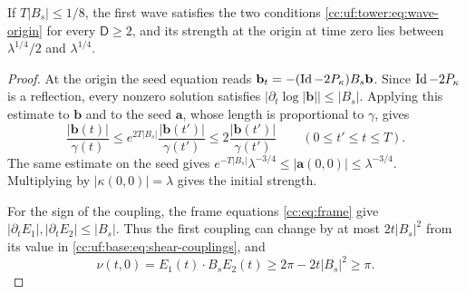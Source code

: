 \begin{lemma}\label{cc:uf:base:lem:first}
If $T|B_s|\le1/8$, the first wave satisfies the two conditions
\eqref{cc:uf:tower:eq:wave-origin} for every $\mathsf D\ge2$, and its
strength at the origin at time zero lies between $\lambda^{1/4}/2$ and
$\lambda^{1/4}$.
\end{lemma}
\begin{proof}
At the origin the seed equation reads
$\mathbf b_t=-(\operatorname{Id}-2P_\kappa)B_s\mathbf b$. Since $\operatorname{Id}-2P_\kappa$
is a reflection, every nonzero solution satisfies
$\bigl|\partial_t\log|\mathbf b|\bigr|\le|B_s|$. Applying this estimate
to $\mathbf b$ and to the seed $\mathbf a$, whose length is proportional
to $\gamma$, gives
\[
 \frac{|\mathbf b(t)|}{\gamma(t)}
 \le e^{2T|B_s|}\frac{|\mathbf b(t')|}{\gamma(t')}
 \le 2\frac{|\mathbf b(t')|}{\gamma(t')}\qquad(0\le t'\le t\le T).
\]
The same estimate on the seed gives
$e^{-T|B_s|}\lambda^{-3/4}\le|\mathbf a(0,0)|\le\lambda^{-3/4}$.
Multiplying by $|\kappa(0,0)|=\lambda$ gives the initial strength.

For the sign of the coupling, the frame equations \eqref{cc:eq:frame}
give $|\partial_tE_1|,|\partial_tE_2|\le|B_s|$. Thus the first coupling
can change by at most $2t|B_s|^2$ from its value in
\eqref{cc:uf:base:eq:shear-couplings}, and
\[
 \nu(t,0)=E_1(t)\cdot B_s E_2(t)\ge 2\pi-2t|B_s|^2\ge\pi .
\]
\end{proof}
